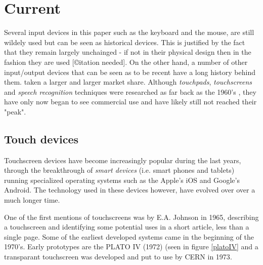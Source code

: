 \section{Current}
\label{current}


Several input devices in this paper such as the keyboard and the mouse, are still wildely used but can be seen as historical devices. This is justified by the fact that they remain largely unchainged - if not in their physical design then in the fashion they are used [©itation needed]. On the other hand, a number of other input/output devices that can be seen as to be recent have a long history behind them. taken a larger and larger market share. Although \emph{touchpads}, \emph{touchscreens} and \emph{speech recognition} techniques were researched as far back as the 1960's \cite{buxton}\cite{shoebox}, they have only now began to see commercial use and have likely still not reached their "peak". 


\subsection{Touch devices}
Touchscreen devices have become increasingly popular during the last years, through the breakthrough of \emph{smart devices} (i.e. smart phones and tablets) running specialized operating systems such as the Apple's iOS and Google's Android. The technology used in these devices however, have evolved over over a much longer time.

One of the first mentions of touchscreens was by E.A. Johnson in 1965, describing a touchscreen and identifying some potential uses in a short article, less than a single page\cite{4205802}. Some of the earliest developed systems came in the beginning of the 1970's. Early prototypes are the PLATO IV\cite{buxton} (1972) (seen in figure \ref{platoIV} and a transparant touchscreen was developed and put to use by CERN in 1973\cite{cern}.

